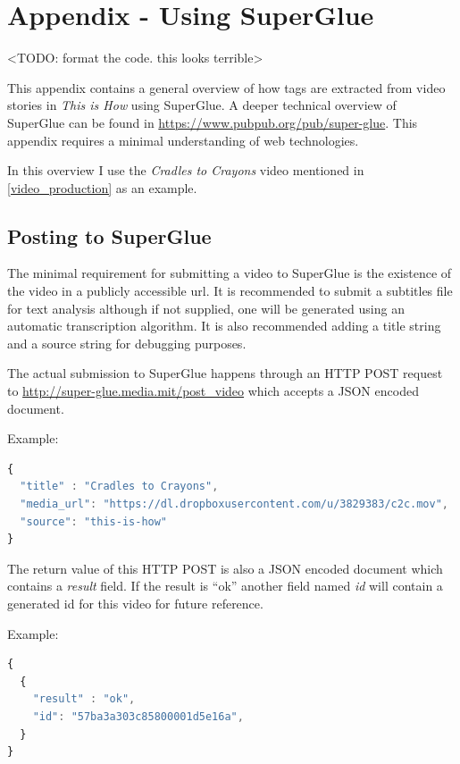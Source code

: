 \chapter{Appendix - Using SuperGlue}
\label{appendix}

<TODO: format the code. this looks terrible>

This appendix contains a general overview of how tags are extracted from video stories in \textit{This is How} using SuperGlue. A deeper technical overview of SuperGlue can be found in \url{https://www.pubpub.org/pub/super-glue}. This appendix requires a minimal understanding of web technologies. 

In this overview I use the \textit{Cradles to Crayons} video mentioned in \ref{video_production} as an example.

\section{Posting to SuperGlue}

The minimal requirement for submitting a video to SuperGlue is the existence of the video in a publicly accessible url. It is recommended to submit a subtitles file for text analysis although if not supplied, one will be generated using an automatic transcription algorithm. It is also recommended adding a title string and a source string for debugging purposes. 

The actual submission to SuperGlue happens through an HTTP POST request to \url{http://super-glue.media.mit/post_video} which accepts a JSON\cite{json} encoded document. 

Example:

\begin{lstlisting}[language=javascript,frame=tb]
{
  "title" : "Cradles to Crayons",
  "media_url": "https://dl.dropboxusercontent.com/u/3829383/c2c.mov",
  "source": "this-is-how"
}
\end{lstlisting}

The return value of this HTTP POST is also a JSON encoded document which contains a \textit{result} field. If the result is ``ok'' another field named \textit{id} will contain a generated id for this video for future reference. 

Example:

\begin{lstlisting}[language=javascript,frame=tb]
{
  {
    "result" : "ok",
    "id": "57ba3a303c85800001d5e16a",
  }
}
\end{lstlisting}

